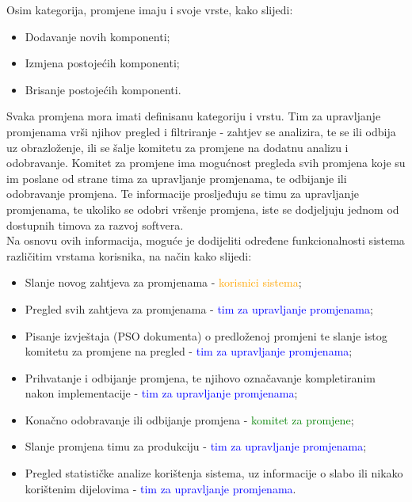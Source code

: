 \documentclass[12pt,a4paper]{article}
\begin{document}
Osim kategorija, promjene imaju i svoje vrste, kako slijedi:

\begin{itemize}
\renewcommand\labelitemi{-}
\item Dodavanje novih komponenti;
\item Izmjena postojećih komponenti;
\item Brisanje postojećih komponenti.
\end{itemize}

Svaka promjena mora imati definisanu kategoriju i vrstu. Tim za upravljanje promjenama vrši njihov pregled i filtriranje - zahtjev se analizira, te se ili odbija uz obrazloženje, ili se šalje komitetu za promjene na dodatnu analizu i odobravanje. Komitet za promjene ima mogućnost pregleda svih promjena koje su im poslane od strane tima za upravljanje promjenama, te odbijanje ili odobravanje promjena. Te informacije prosljeđuju se timu za upravljanje promjenama, te ukoliko se odobri vršenje promjena, iste se dodjeljuju jednom od dostupnih timova za razvoj softvera. \\

Na osnovu ovih informacija, moguće je dodijeliti određene funkcionalnosti sistema različitim vrstama korisnika, na način kako slijedi:

\begin{itemize}
\renewcommand\labelitemi{$\square$}
\item Slanje novog zahtjeva za promjenama - \textcolor{orange}{korisnici sistema};
\item Pregled svih zahtjeva za promjenama - \textcolor{blue}{tim za upravljanje promjenama};
\item Pisanje izvještaja (PSO dokumenta) o predloženoj promjeni te slanje istog komitetu za promjene na pregled - \textcolor{blue}{tim za upravljanje promjenama};
\item Prihvatanje i odbijanje promjena, te njihovo označavanje kompletiranim nakon implementacije - \textcolor{blue}{tim za upravljanje promjenama};
\item Konačno odobravanje ili odbijanje promjena - \textcolor{green}{komitet za promjene};
\item Slanje promjena timu za produkciju - \textcolor{blue}{tim za upravljanje promjenama};
\item Pregled statističke analize korištenja sistema, uz informacije o slabo ili nikako korištenim dijelovima - \textcolor{blue}{tim za upravljanje promjenama}.
\end{itemize}
\end{document}

